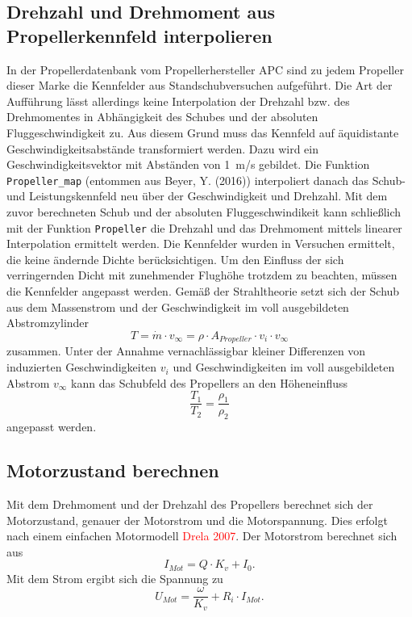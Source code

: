 \subsection{Drehzahl und Drehmoment aus Propellerkennfeld interpolieren}
In der Propellerdatenbank vom Propellerhersteller APC sind zu jedem Propeller dieser Marke die Kennfelder aus Standschubversuchen aufgeführt. Die Art der Aufführung lässt allerdings keine Interpolation der Drehzahl bzw. des Drehmomentes in Abhängigkeit des Schubes und der absoluten Fluggeschwindigkeit zu. Aus diesem Grund muss das Kennfeld auf äquidistante Geschwindigkeitsabstände transformiert werden. Dazu wird ein Geschwindigkeitsvektor mit Abständen von \SI{1}{m/s} gebildet. Die Funktion \texttt{Propeller\_map} (entommen aus Beyer, Y. (2016)) interpoliert danach das Schub- und Leistungskennfeld neu über der Geschwindigkeit und Drehzahl. Mit dem zuvor berechneten Schub und der absoluten Fluggeschwindikeit kann schließlich mit der Funktion \texttt{Propeller} die Drehzahl und das Drehmoment mittels linearer Interpolation ermittelt werden.
Die Kennfelder wurden in Versuchen ermittelt, die keine ändernde Dichte berücksichtigen. Um den Einfluss der sich verringernden Dicht mit zunehmender Flughöhe trotzdem zu beachten, müssen die Kennfelder angepasst werden. Gemäß der Strahltheorie setzt sich der Schub aus dem Massenstrom und der Geschwindigkeit im voll ausgebildeten Abstromzylinder 
\begin{equation}
	T =  \dot{m}\cdot v_{\infty} = \rho\cdot A_{Propeller}\cdot v_i\cdot v_{\infty}
\end{equation}
zusammen. Unter der Annahme vernachlässigbar kleiner Differenzen von  induzierten Geschwindigkeiten $v_i$ und Geschwindigkeiten im voll ausgebildeten Abstrom $v_{\infty}$ kann das Schubfeld des Propellers an den Höheneinfluss 
\begin{equation}
	\frac{T_1}{T_2} = \frac{\rho_1}{\rho_2}
\end{equation}
angepasst werden.


\subsection{Motorzustand berechnen}
Mit dem Drehmoment und der Drehzahl des Propellers berechnet sich der Motorzustand, genauer der Motorstrom und die Motorspannung. Dies erfolgt nach einem einfachen Motormodell \textcolor{red}{Drela 2007}.
Der Motorstrom berechnet sich aus 
\begin{equation}
	I_{Mot} = Q\cdot K_v + I_0.
\end{equation}
Mit dem Strom ergibt sich die Spannung zu
\begin{equation}
	U_{Mot} = \frac{\omega}{K_v} + R_i\cdot I_{Mot}.
\end{equation}


